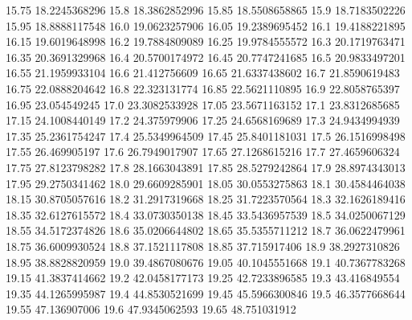           15.75    18.2245368296
           15.8    18.3862852996
          15.85    18.5508658865
           15.9    18.7183502226
          15.95    18.8888117548
           16.0    19.0623257906
          16.05    19.2389695452
           16.1    19.4188221895
          16.15    19.6019648998
           16.2    19.7884809089
          16.25    19.9784555572
           16.3    20.1719763471
          16.35    20.3691329968
           16.4    20.5700174972
          16.45    20.7747241685
           16.5    20.9833497201
          16.55    21.1959933104
           16.6     21.412756609
          16.65    21.6337438602
           16.7    21.8590619483
          16.75    22.0888204642
           16.8     22.323131774
          16.85    22.5621110895
           16.9    22.8058765397
          16.95     23.054549245
           17.0    23.3082533928
          17.05    23.5671163152
           17.1    23.8312685685
          17.15    24.1008440149
           17.2     24.375979906
          17.25    24.6568169689
           17.3    24.9434994939
          17.35    25.2361754247
           17.4    25.5349964509
          17.45    25.8401181031
           17.5    26.1516998498
          17.55     26.469905197
           17.6    26.7949017907
          17.65    27.1268615216
           17.7    27.4659606324
          17.75    27.8123798282
           17.8    28.1663043891
          17.85    28.5279242864
           17.9    28.8974343013
          17.95    29.2750341462
           18.0    29.6609285901
          18.05    30.0553275863
           18.1    30.4584464038
          18.15    30.8705057616
           18.2    31.2917319668
          18.25    31.7223570564
           18.3    32.1626189416
          18.35    32.6127615572
           18.4    33.0730350138
          18.45    33.5436957539
           18.5    34.0250067129
          18.55    34.5172374826
           18.6    35.0206644802
          18.65    35.5355711212
           18.7    36.0622479961
          18.75    36.6009930524
           18.8    37.1521117808
          18.85     37.715917406
           18.9    38.2927310826
          18.95    38.8828820959
           19.0    39.4867080676
          19.05    40.1045551668
           19.1    40.7367783268
          19.15    41.3837414662
           19.2    42.0458177173
          19.25    42.7233896585
           19.3     43.416849554
          19.35    44.1265995987
           19.4    44.8530521699
          19.45    45.5966300846
           19.5    46.3577668644
          19.55     47.136907006
           19.6    47.9345062593
          19.65     48.751031912
